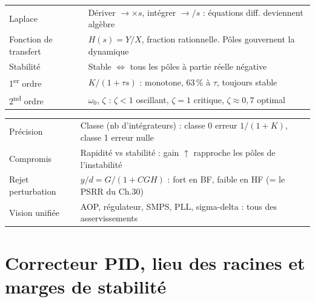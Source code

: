 \documentclass[12pt,a4paper,twoside]{book}
\begin{document}
\begin{approfondissement}[title={\color{white} Résumé --- Approfondissement}]
\begin{center}
\renewcommand{\arraystretch}{1.3}
\begin{tabular}{p{3.5cm}p{9.5cm}}
\toprule
Laplace & Dériver $\to \times s$, intégrer $\to /s$ : équations diff. deviennent algèbre \\
Fonction de transfert & $H(s) = Y/X$, fraction rationnelle. Pôles gouvernent la dynamique \\
Stabilité & Stable $\iff$ tous les pôles à partie réelle négative \\
1\textsuperscript{er} ordre & $K/(1+\tau s)$ : monotone, 63\,\% à $\tau$, toujours stable \\
2\textsuperscript{nd} ordre & $\omega_0$, $\zeta$ : $\zeta<1$ oscillant, $\zeta=1$ critique, $\zeta\approx0{,}7$ optimal \\
\bottomrule
\end{tabular}
\end{center}
\end{approfondissement}

\begin{ingenieur}[title={\color{white} Résumé --- Niveau Ingénieur}]
\begin{center}
\renewcommand{\arraystretch}{1.3}
\begin{tabular}{p{3.5cm}p{9.5cm}}
\toprule
Précision & Classe (nb d'intégrateurs) : classe 0 erreur $1/(1+K)$, classe 1 erreur nulle \\
Compromis & Rapidité vs stabilité : gain $\uparrow$ rapproche les pôles de l'instabilité \\
Rejet perturbation & $y/d = G/(1+CGH)$ : fort en BF, faible en HF (= le PSRR du Ch.30) \\
Vision unifiée & AOP, régulateur, SMPS, PLL, sigma-delta : tous des asservissements \\
\bottomrule
\end{tabular}
\end{center}
\end{ingenieur}


\chapter{Correcteur PID, lieu des racines et marges de stabilité}
\end{document}

